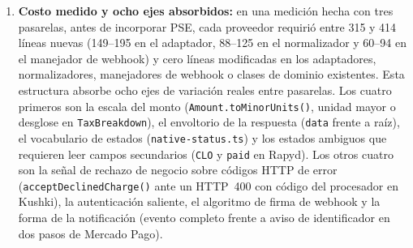 \begin{enumerate}
  \item \textbf{Costo medido y ocho ejes absorbidos:} en una medición hecha con tres pasarelas, antes de incorporar PSE, cada proveedor requirió entre 315 y 414 líneas nuevas (149--195 en el adaptador, 88--125 en el normalizador y 60--94 en el manejador de webhook) y cero líneas modificadas en los adaptadores, normalizadores, manejadores de webhook o clases de dominio existentes. Esta estructura absorbe ocho ejes de variación reales entre pasarelas. Los cuatro primeros son la escala del monto (\texttt{Amount.toMinorUnits()}, unidad mayor o desglose en \texttt{TaxBreakdown}), el envoltorio de la respuesta (\texttt{data} frente a raíz), el vocabulario de estados (\texttt{native-status.ts}) y los estados ambiguos que requieren leer campos secundarios (\texttt{CLO} y \texttt{paid} en Rapyd). Los otros cuatro son la señal de rechazo de negocio sobre códigos HTTP de error (\texttt{acceptDeclinedCharge()} ante un HTTP~400 con código del procesador en Kushki), la autenticación saliente, el algoritmo de firma de webhook y la forma de la notificación (evento completo frente a aviso de identificador en dos pasos de Mercado Pago).
\end{enumerate}

